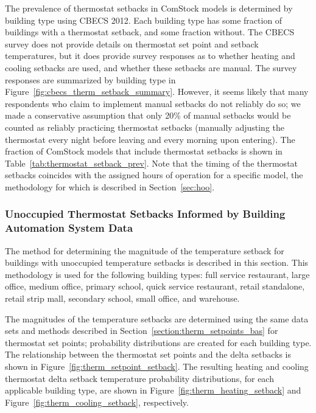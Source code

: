 The prevalence of thermostat setbacks in ComStock models is determined by building type using CBECS 2012. Each building type has some fraction of buildings with a thermostat setback, and some fraction without. The CBECS survey does not provide details on thermostat set point and setback temperatures, but it does provide survey responses as to whether heating and cooling setbacks are used, and whether these setbacks are manual. The survey responses are summarized by building type in Figure~\ref{fig:cbecs_therm_setback_summary}. However, it seems likely that many respondents who claim to implement manual setbacks do not reliably do so; we made a conservative assumption that only 20\% of manual setbacks would be counted as reliably practicing thermostat setbacks (manually adjusting the thermostat every night before leaving and every morning upon entering). The fraction of ComStock models that include thermostat setbacks is shown in Table~\ref{tab:thermostat_setback_prev}. Note that the timing of the thermostat setbacks coincides with the assigned hours of operation for a specific model, the methodology for which is described in Section~\ref{sec:hoo}.

\medskip


\subsubsection{Unoccupied Thermostat Setbacks Informed by Building Automation System Data}

The method for determining the magnitude of the temperature setback for buildings with unoccupied temperature setbacks is described in this section. This methodology is used for the following building types: full service restaurant, large office, medium office, primary school, quick service restaurant, retail standalone, retail strip mall, secondary school, small office, and warehouse.

The magnitudes of the temperature setbacks are determined using the same data sets and methods described in Section~\ref{section:therm_setpoints_bas} for thermostat set points; probability distributions are created for each building type. The relationship between the thermostat set points and the delta setbacks is shown in Figure~\ref{fig:therm_setpoint_setback}. The resulting heating and cooling thermostat delta setback temperature probability distributions, for each applicable building type, are shown in Figure~\ref{fig:therm_heating_setback} and Figure~\ref{fig:therm_cooling_setback}, respectively. 


